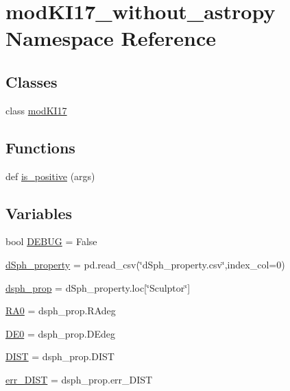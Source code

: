 \hypertarget{namespacemodKI17__without__astropy}{}\section{mod\+K\+I17\+\_\+without\+\_\+astropy Namespace Reference}
\label{namespacemodKI17__without__astropy}
\subsection*{Classes}
\begin{DoxyCompactItemize}
\item 
class \hyperlink{classmodKI17__without__astropy_1_1modKI17}{mod\+K\+I17}
\end{DoxyCompactItemize}
\subsection*{Functions}
\begin{DoxyCompactItemize}
\item 
def \hyperlink{namespacemodKI17__without__astropy_a80eeeb18d69cff2fde94fdb26c7c0089}{is\+\_\+positive} (args)
\end{DoxyCompactItemize}
\subsection*{Variables}
\begin{DoxyCompactItemize}
\item 
bool \hyperlink{namespacemodKI17__without__astropy_a9926562322307b1c395c77276b16cb19}{D\+E\+B\+UG} = False
\item 
\hyperlink{namespacemodKI17__without__astropy_a8ee9b076d16981905ef56923bfe9754b}{d\+Sph\+\_\+property} = pd.\+read\+\_\+csv(\char`\"{}d\+Sph\+\_\+property.\+csv\char`\"{},index\+\_\+col=0)
\item 
\hyperlink{namespacemodKI17__without__astropy_a8c61ead2c1a6eb4bd90d556559426eeb}{dsph\+\_\+prop} = d\+Sph\+\_\+property.\+loc\mbox{[}\char`\"{}Sculptor\char`\"{}\mbox{]}
\item 
\hyperlink{namespacemodKI17__without__astropy_a111dd482ab93c59e7e699c09461774bf}{R\+A0} = dsph\+\_\+prop.\+R\+Adeg
\item 
\hyperlink{namespacemodKI17__without__astropy_a20c59be5b70f1194d0996e8582c47eba}{D\+E0} = dsph\+\_\+prop.\+D\+Edeg
\item 
\hyperlink{namespacemodKI17__without__astropy_a94a8ea6dca3b1f107734b2a0312c5087}{D\+I\+ST} = dsph\+\_\+prop.\+D\+I\+ST
\item 
\hyperlink{namespacemodKI17__without__astropy_a891a5d443d2d4949f4d6fc6121650b81}{err\+\_\+\+D\+I\+ST} = dsph\+\_\+prop.\+err\+\_\+\+D\+I\+ST
\end{DoxyCompactItemize}


